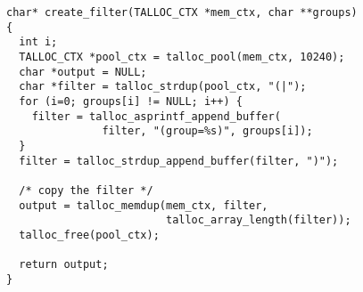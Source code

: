 \begin{lstlisting}[caption={Appending a string with a pool context},
morekeywords={talloc_pool,talloc_memdup}]
char* create_filter(TALLOC_CTX *mem_ctx, char **groups)
{
  int i;
  TALLOC_CTX *pool_ctx = talloc_pool(mem_ctx, 10240);
  char *output = NULL;
  char *filter = talloc_strdup(pool_ctx, "(|");
  for (i=0; groups[i] != NULL; i++) {
    filter = talloc_asprintf_append_buffer(
               filter, "(group=%s)", groups[i]);
  }
  filter = talloc_strdup_append_buffer(filter, ")");
  
  /* copy the filter */
  output = talloc_memdup(mem_ctx, filter,
                         talloc_array_length(filter));
  talloc_free(pool_ctx);

  return output;
}
\end{lstlisting}
